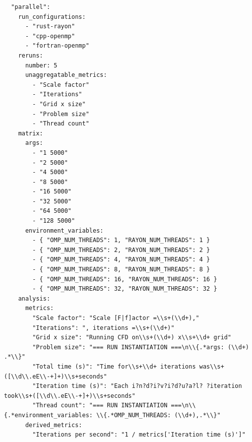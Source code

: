\begin{listing}[H]
\begin{verbatim}
  "parallel":
    run_configurations:
      - "rust-rayon"
      - "cpp-openmp"
      - "fortran-openmp"
    reruns:
      number: 5
      unaggregatable_metrics:
        - "Scale factor"
        - "Iterations"
        - "Grid x size"
        - "Problem size"
        - "Thread count"
    matrix:
      args:
        - "1 5000"
        - "2 5000"
        - "4 5000"
        - "8 5000"
        - "16 5000"
        - "32 5000"
        - "64 5000"
        - "128 5000"
      environment_variables:
        - { "OMP_NUM_THREADS": 1, "RAYON_NUM_THREADS": 1 }
        - { "OMP_NUM_THREADS": 2, "RAYON_NUM_THREADS": 2 }
        - { "OMP_NUM_THREADS": 4, "RAYON_NUM_THREADS": 4 }
        - { "OMP_NUM_THREADS": 8, "RAYON_NUM_THREADS": 8 }
        - { "OMP_NUM_THREADS": 16, "RAYON_NUM_THREADS": 16 }
        - { "OMP_NUM_THREADS": 32, "RAYON_NUM_THREADS": 32 }
    analysis:
      metrics:
        "Scale factor": "Scale [F|f]actor =\\s+(\\d+),"
        "Iterations": ", iterations =\\s+(\\d+)"
        "Grid x size": "Running CFD on\\s+(\\d+) x\\s+\\d+ grid"
        "Problem size": "=== RUN INSTANTIATION ===\n\\{.*args: (\\d+) .*\\}"
        "Total time (s)": "Time for\\s+\\d+ iterations was\\s+([\\d\\.eE\\-+]+)\\s+seconds"
        "Iteration time (s)": "Each i?n?d?i?v?i?d?u?a?l? ?iteration took\\s+([\\d\\.eE\\-+]+)\\s+seconds"
        "Thread count": "=== RUN INSTANTIATION ===\n\\{.*environment_variables: \\{.*OMP_NUM_THREADS: (\\d+),.*\\}"
      derived_metrics:
        "Iterations per second": "1 / metrics['Iteration time (s)']"

\end{verbatim}
\end{listing}
